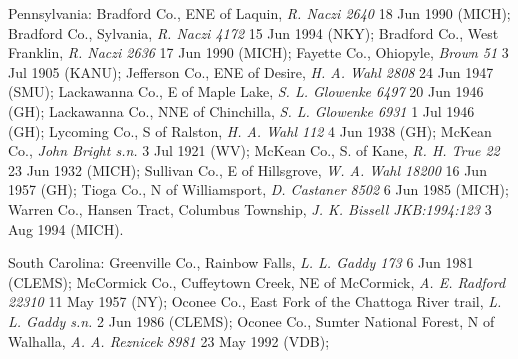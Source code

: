 \documentclass{article}
\begin{document}
Pennsylvania:
Bradford Co., ENE of Laquin, \textit{R. Naczi 2640} 18 Jun 1990 (MICH);
Bradford Co., Sylvania, \textit{R. Naczi 4172} 15 Jun 1994 (NKY);
Bradford Co., West Franklin, \textit{R. Naczi 2636} 17 Jun 1990 (MICH);
Fayette Co., Ohiopyle, \textit{Brown 51} 3 Jul 1905 (KANU);
Jefferson Co., ENE of Desire, \textit{H. A. Wahl 2808} 24 Jun 1947 (SMU);
Lackawanna Co., E of Maple Lake, \textit{S. L. Glowenke 6497} 20 Jun 1946 (GH);
Lackawanna Co., NNE of Chinchilla, \textit{S. L. Glowenke 6931} 1 Jul 1946 (GH);
Lycoming Co., S of Ralston, \textit{H. A. Wahl 112} 4 Jun 1938 (GH);
McKean Co., \textit{John Bright s.n.} 3 Jul 1921 (WV);
McKean Co., S. of Kane, \textit{R. H. True 22} 23 Jun 1932 (MICH);
Sullivan Co., E of Hillsgrove, \textit{W. A. Wahl 18200} 16 Jun 1957 (GH);
Tioga Co., N of Williamsport, \textit{D. Castaner 8502} 6 Jun 1985 (MICH);
Warren Co., Hansen Tract, Columbus Township, \textit{J. K. Bissell JKB:1994:123} 3 Aug 1994 (MICH).

South Carolina:
Greenville Co., Rainbow Falls, \textit{L. L. Gaddy 173} 6 Jun 1981 (CLEMS);
McCormick Co., Cuffeytown Creek,  NE of McCormick, \textit{A. E. Radford 22310} 11 May 1957 (NY);
Oconee Co., East Fork of the Chattoga River trail, \textit{L. L. Gaddy s.n.} 2 Jun 1986 (CLEMS);
Oconee Co., Sumter National Forest, N of Walhalla, \textit{A. A. Reznicek 8981} 23 May 1992 (VDB);
\end{document}
